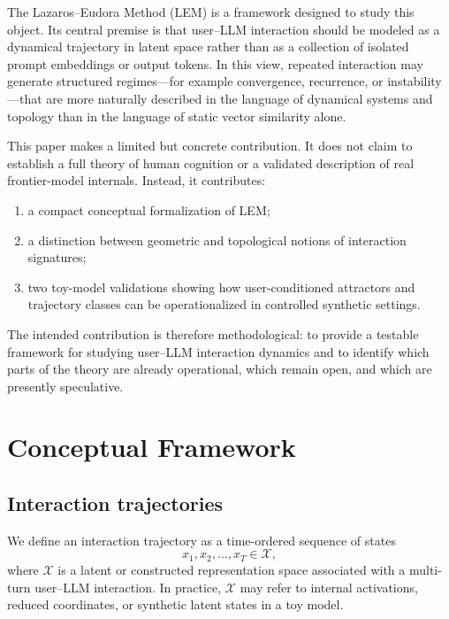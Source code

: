 \documentclass[11pt]{article}
\begin{document}
The Lazaros--Eudora Method (LEM) is a framework designed to study this object. Its
central premise is that user--LLM interaction should be modeled as a dynamical
trajectory in latent space rather than as a collection of isolated prompt
embeddings or output tokens. In this view, repeated interaction may generate
structured regimes---for example convergence, recurrence, or instability---that
are more naturally described in the language of dynamical systems and topology
than in the language of static vector similarity alone.

This paper makes a limited but concrete contribution. It does not claim to
establish a full theory of human cognition or a validated description of real
frontier-model internals. Instead, it contributes:

\begin{enumerate}[leftmargin=1.8em]
  \item a compact conceptual formalization of LEM;
  \item a distinction between geometric and topological notions of interaction
        signatures;
  \item two toy-model validations showing how user-conditioned attractors and
        trajectory classes can be operationalized in controlled synthetic
        settings.
\end{enumerate}

The intended contribution is therefore methodological: to provide a testable
framework for studying user--LLM interaction dynamics and to identify which parts
of the theory are already operational, which remain open, and which are presently
speculative.


\section{Conceptual Framework}

\subsection{Interaction trajectories}

We define an interaction trajectory as a time-ordered sequence of states
\[
  x_1, x_2, \ldots, x_T \in \mathcal{X},
\]
where $\mathcal{X}$ is a latent or constructed representation space associated with
a multi-turn user--LLM interaction. In practice, $\mathcal{X}$ may refer to internal
activations, reduced coordinates, or synthetic latent states in a toy model.
\end{document}
